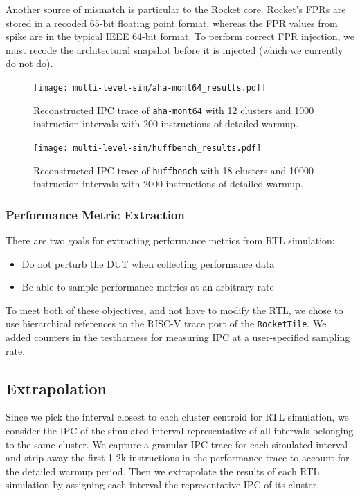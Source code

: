 \documentclass[sigplan,nonacm,10pt]{acmart}
\begin{document}
Another source of mismatch is particular to the Rocket core.
Rocket's FPRs are stored in a recoded 65-bit floating point format, whereas the FPR values from spike are in the typical IEEE 64-bit format.
To perform correct FPR injection, we must recode the architectural snapshot before it is injected (which we currently do not do).

\begin{figure}
  \texttt{[image: multi-level-sim/aha-mont64\_results.pdf]}
  \caption{Reconstructed IPC trace of \texttt{aha-mont64} with 12 clusters and 1000 instruction intervals with 200 instructions of detailed warmup.}
  \label{fig:ipc_trace_reconstruction_aha}
\end{figure}

\begin{figure}
  \texttt{[image: multi-level-sim/huffbench\_results.pdf]}
  \caption{Reconstructed IPC trace of \texttt{huffbench} with 18 clusters and 10000 instruction intervals with 2000 instructions of detailed warmup.}
  \label{fig:ipc_trace_reconstruction_huffbench}
\end{figure}

\subsubsection{Performance Metric Extraction}

There are two goals for extracting performance metrics from RTL simulation:
\begin{itemize}
  \item Do not perturb the DUT when collecting performance data
  \item Be able to sample performance metrics at an arbitrary rate
\end{itemize}

To meet both of these objectives, and not have to modify the RTL, we chose to use hierarchical references to the RISC-V trace port of the \texttt{RocketTile}.
We added counters in the testharness for measuring IPC at a user-specified sampling rate.

\subsection{Extrapolation}

Since we pick the interval closest to each cluster centroid for RTL simulation, we consider the IPC of the simulated interval representative of all intervals belonging to the same cluster.
We capture a granular IPC trace for each simulated interval and strip away the first 1-2k instructions in the performance trace to account for the detailed warmup period.
Then we extrapolate the results of each RTL simulation by assigning each interval the representative IPC of its cluster.
\end{document}
